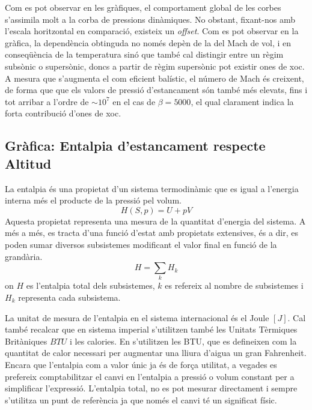 Com es pot observar en les gràfiques, el comportament global de les corbes s'assimila molt a la corba de pressions dinàmiques. No obstant, fixant-nos amb l'escala horitzontal en comparació, existeix un \textit{offset}. Com es pot observar en la gràfica, la dependència obtinguda no només depèn de la del Mach de vol, i en conseqüència de la temperatura sinó que també cal distingir entre un règim subsònic o supersònic, doncs a partir de règim supersònic pot existir ones de xoc. A mesura que s'augmenta el com
eficient balístic, el número de Mach és creixent, de forma que que els valors de pressió d'estancament són també més elevats, fins i tot arribar a l'ordre de $\sim 10^7$ en el cas de $\beta=5000$, el qual clarament indica la forta contribució d'ones de xoc.


\newpage
\subsection{Gràfica: Entalpia d'estancament respecte Altitud}
La entalpia és una propietat d'un sistema termodinàmic que es igual a l'energia interna més el producte de la pressió pel volum.
\begin{equation}
    H(S,p) = U + p V
\end{equation}
Aquesta propietat representa una mesura de la quantitat d'energia del sistema. A més a més, es tracta d'una funció d'estat amb propietats extensives, és a dir, es poden sumar diversos subsistemes modificant el valor final en funció de la grandària.
\begin{equation}
    H = \sum_k H_k
\end{equation}
on $H$ es l'entalpia total dels subsistemes, $k$ es refereix al nombre de subsistemes i $H_k$ representa cada subsistema.

La unitat de mesura de l'entalpia en el sistema internacional és el Joule $[J]$. Cal també recalcar que en sistema imperial s'utilitzen també les Unitats Tèrmiques Britàniques $BTU$ i les calories. 
En \cite{adams} s'utilitzen les BTU, que es defineixen com la quantitat de calor necessari per augmentar una lliura d'aigua un gran Fahrenheit.
Encara que l'entalpia com a valor únic ja és de força utilitat, a vegades es prefereix comptabilitzar el canvi en l'entalpia a pressió o volum constant per a simplificar l'expressió. L'entalpia total, no es pot mesurar directament i sempre s'utilitza un punt de referència ja que només el canvi té un significat físic.

